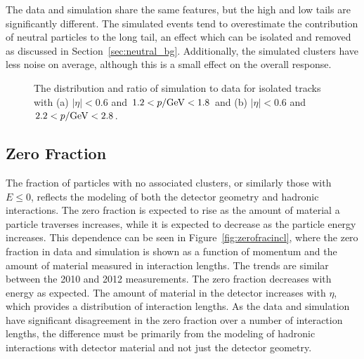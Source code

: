 The data and simulation share the same features, but the high and low tails are significantly different.
The simulated events tend to overestimate the contribution of neutral particles to the long tail, an effect which can be isolated and removed as discussed in Section~\ref{sec:neutral_bg}. 
Additionally, the simulated clusters have less noise on average, although this is a small effect on the overall response.

\begin{figure}[htbp]
\centering
{}
\caption{The \ep distribution and ratio of simulation to data for isolated tracks with (a) $|\eta| < 0.6$ and $1.2 < p /\mathrm{Ge\kern -0.05em V} < 1.8$ and (b) $|\eta| < 0.6$ and $2.2 < p /\mathrm{Ge\kern -0.05em V} < 2.8$.}

\label{fig:eoverp}
\end{figure}

\subsection{Zero Fraction}
\label{sec:zero_fraction}

The fraction of particles with no associated clusters, or similarly those with $E \leq 0$, reflects the modeling of both the detector geometry and hadronic interactions.
The zero fraction is expected to rise as the amount of material a particle traverses increases, while it is expected to decrease as the particle energy increases.
This dependence can be seen in Figure~\ref{fig:zerofracincl}, where the zero fraction in data and simulation is shown as a function of momentum and the amount of material measured in interaction lengths.
The trends are similar between the 2010 and 2012 measurements.
The zero fraction decreases with energy as expected.
The amount of material in the detector increases with $\eta$, which provides a distribution of interaction lengths.
As the data and simulation have significant disagreement in the zero fraction over a number of interaction lengths, the difference must be primarily from the modeling of hadronic interactions with detector material and not just the detector geometry.

